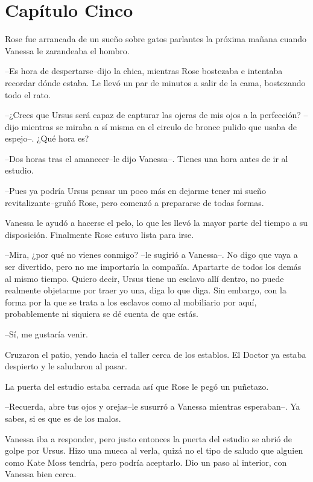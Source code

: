 \chapter*{Capítulo Cinco}

Rose fue arrancada de un sueño sobre gatos parlantes la próxima mañana
cuando Vanessa le zarandeaba el hombro.

--Es hora de despertarse--dijo la chica, mientras Rose bostezaba e
intentaba recordar dónde estaba. Le llevó un par de minutos a salir de
la cama, bostezando todo el rato.

--¿Crees que Ursus será capaz de capturar las ojeras de mis ojos a la
perfección? --dijo mientras se miraba a sí misma en el circulo de bronce
pulido que usaba de espejo--. ¿Qué hora es?

--Dos horas tras el amanecer--le dijo Vanessa--. Tienes una hora antes
de ir al estudio.

--Pues ya podría Ursus pensar un poco más en dejarme tener mi sueño
revitalizante--gruñó Rose, pero comenzó a prepararse de todas formas.

Vanessa le ayudó a hacerse el pelo, lo que les llevó la mayor parte del
tiempo a su disposición. Finalmente Rose estuvo lista para irse.

--Mira, ¿por qué no vienes conmigo? --le sugirió a Vanessa--. No digo
que vaya a ser divertido, pero no me importaría la compañía. Apartarte
de todos los demás al mismo tiempo. Quiero decir, Ursus tiene un esclavo
allí dentro, no puede realmente objetarme por traer yo una, diga lo que
diga. Sin embargo, con la forma por la que se trata a los esclavos como
al mobiliario por aquí, probablemente ni siquiera se dé cuenta de que
estás.

--Sí, me gustaría venir.

Cruzaron el patio, yendo hacia el taller cerca de los establos. El
Doctor ya estaba despierto y le saludaron al pasar.

La puerta del estudio estaba cerrada así que Rose le pegó un puñetazo.

--Recuerda, abre tus ojos y orejas--le susurró a Vanessa mientras
esperaban--. Ya sabes, si es que es de los malos.

Vanessa iba a responder, pero justo entonces la puerta del estudio se
abrió de golpe por Ursus. Hizo una mueca al verla, quizá no el tipo de
saludo que alguien como Kate Moss tendría, pero podría aceptarlo. Dio un
paso al interior, con Vanessa bien cerca.

